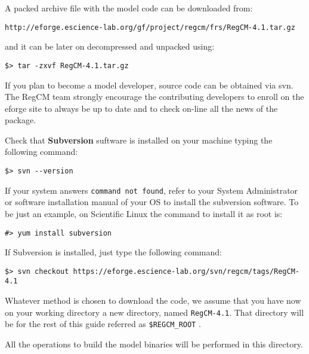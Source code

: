%
%

A packed archive file with the model code can be downloaded from:

\begin{Verbatim}
http://eforge.escience-lab.org/gf/project/regcm/frs/RegCM-4.1.tar.gz
\end{Verbatim}

and it can be later on decompressed and unpacked using:

\begin{Verbatim}
$> tar -zxvf RegCM-4.1.tar.gz
\end{Verbatim}

If you plan to become a model developer, source code can be obtained via svn.
The RegCM team strongly encourage the contributing developers to enroll on
the eforge site to always be up to date and to check on-line all the news of
the package.

Check that {\bf Subversion} suftware is installed on your machine typing
the following command:

\begin{verbatim}
$> svn --version
\end{verbatim}

If your system answers \verb=command not found=, refer to your System
Administrator or software installation manual of your OS to install the
subversion software. To be just an example, on Scientific Linux the command
to install it as root is:

\begin{verbatim}
#> yum install subversion
\end{verbatim}

If Subversion is installed, just type the following command:

\begin{verbatim}
$> svn checkout https://eforge.escience-lab.org/svn/regcm/tags/RegCM-4.1
\end{verbatim}

Whatever method is chosen to download the code, we assume that you have now
on your working directory a new directory, named \verb=RegCM-4.1=.
That directory will be for the rest of this guide referred as 
\verb=$REGCM_ROOT= .

All the operations to build the model binaries will be performed in this
directory.
